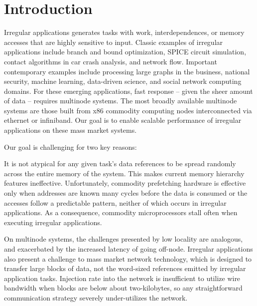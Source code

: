 \section{Introduction} \label{sec:intro}

Irregular applications generates tasks with work, interdependences, or memory
accesses that are highly sensitive to input. Classic examples of irregular
applications include branch and bound optimization, SPICE circuit simulation,
contact algorithms in car crash analysis, and network flow. Important
contemporary examples include processing large graphs in the business,
national security, machine learning, data-driven science, and social network
computing domains. For these emerging applications, fast response -- given the
sheer amount of data -- requires multinode systems. The most broadly available
multinode systems are those built from x86 commodity computing nodes
interconnected via ethernet or infiniband. Our goal is to enable scalable
performance of irregular applications on these mass market systems.

Our goal is challenging for two key reasons: 

 It is
not atypical for any given task's data references to be spread randomly across
the entire memory of the system. This makes current memory hierarchy features
ineffective. Unfortunately, commodity prefetching hardware is effective only
when addresses are known many cycles before the data is consumed or the
accesses follow a predictable pattern, neither of which occurs in irregular
applications. As a consequence, commodity microprocessors stall often when
executing irregular applications.



 On multinode systems, the challenges presented by low
locality are analogous, and exacerbated by the increased latency of going
off-node. Irregular applications also present a challenge to mass market
network technology, which is designed to transfer large blocks of data, not
the word-sized references emitted by irregular application tasks. Injection
rate into the network is insufficient to utilize wire bandwidth when blocks
are below about two-kilobytes, so any straightforward communication strategy
severely under-utilizes the network. 

